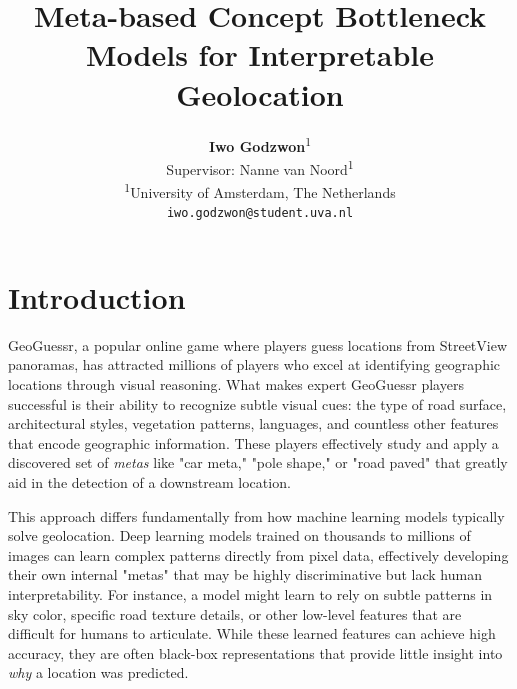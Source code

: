 \documentclass{article}
\author{%
    \textbf{Iwo Godzwon}\textsuperscript{1} \\[0.5em] %
    \small Supervisor: Nanne van Noord\textsuperscript{1} \\[1em] %
    \textsuperscript{1}\small University of Amsterdam, The Netherlands \\
    \small \texttt{iwo.godzwon@student.uva.nl}
}
\begin{document}
\title{Meta-based Concept Bottleneck Models for Interpretable Geolocation}



\maketitle




\section{Introduction}

GeoGuessr, a popular online game where players guess locations from StreetView panoramas, has attracted millions of players who excel at identifying geographic locations through visual reasoning. What makes expert GeoGuessr players successful is their ability to recognize subtle visual cues: the type of road surface, architectural styles, vegetation patterns, languages, and countless other features that encode geographic information. These players effectively study and apply a discovered set of \textit{metas} like "car meta," "pole shape," or "road paved" that greatly aid in the detection of a downstream location.

This approach differs fundamentally from how machine learning models typically solve geolocation. Deep learning models trained on thousands to millions of images can learn complex patterns directly from pixel data, effectively developing their own internal "metas" that may be highly discriminative but lack human interpretability. For instance, a model might learn to rely on subtle patterns in sky color, specific road texture details, or other low-level features that are difficult for humans to articulate. While these learned features can achieve high accuracy, they are often black-box representations that provide little insight into \textit{why} a location was predicted.
\end{document}
